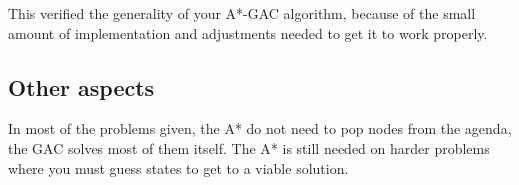 This verified the generality of your A*-GAC algorithm, because of the small amount of implementation and adjustments needed to get it to work properly.

\subsection{Other aspects}
In most of the problems given, the A* do not need to pop nodes from the agenda, the GAC solves most of them itself. The A* is still needed on harder problems where you must guess states to get to a viable solution.

